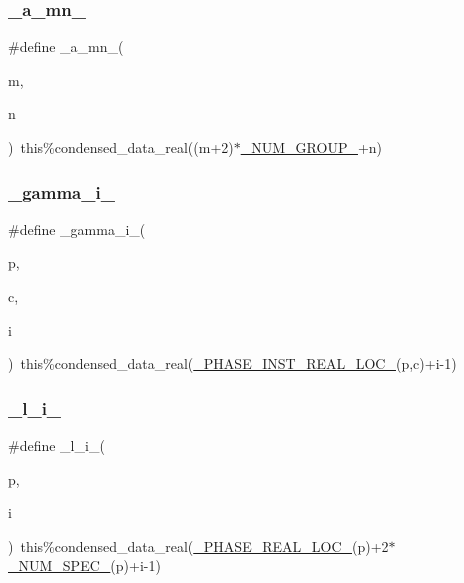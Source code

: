 \subsubsection{\texorpdfstring{\+\_\+a\+\_\+mn\+\_\+}{\_a\_mn\_}}
{\footnotesize\ttfamily \#define \+\_\+a\+\_\+mn\+\_\+(\begin{DoxyParamCaption}\item[{}]{m,  }\item[{}]{n }\end{DoxyParamCaption})~this\%condensed\+\_\+data\+\_\+real((m+2)$\ast$\mbox{\hyperlink{sub__model___u_n_i_f_a_c_8_f90_aaf6ff3fa100a1fa0baec9dba65df6891}{\+\_\+\+N\+U\+M\+\_\+\+G\+R\+O\+U\+P\+\_\+}}+n)}

\mbox{\label{sub__model___u_n_i_f_a_c_8_f90_a24dd72b4548c6a0a1cd1756ad308b128}} 
\subsubsection{\texorpdfstring{\+\_\+gamma\+\_\+i\+\_\+}{\_gamma\_i\_}}
{\footnotesize\ttfamily \#define \+\_\+gamma\+\_\+i\+\_\+(\begin{DoxyParamCaption}\item[{}]{p,  }\item[{}]{c,  }\item[{}]{i }\end{DoxyParamCaption})~this\%condensed\+\_\+data\+\_\+real(\mbox{\hyperlink{sub__model___u_n_i_f_a_c_8_f90_ae36fd1141e660c79dd12eac64d119f66}{\+\_\+\+P\+H\+A\+S\+E\+\_\+\+I\+N\+S\+T\+\_\+\+R\+E\+A\+L\+\_\+\+L\+O\+C\+\_\+}}(p,c)+i-\/1)}

\mbox{\label{sub__model___u_n_i_f_a_c_8_f90_af1c31ccacab06f0ad67cb12af666dfd3}} 
\subsubsection{\texorpdfstring{\+\_\+l\+\_\+i\+\_\+}{\_l\_i\_}}
{\footnotesize\ttfamily \#define \+\_\+l\+\_\+i\+\_\+(\begin{DoxyParamCaption}\item[{}]{p,  }\item[{}]{i }\end{DoxyParamCaption})~this\%condensed\+\_\+data\+\_\+real(\mbox{\hyperlink{sub__model___u_n_i_f_a_c_8_f90_a82db0e0fff4e8ab602fb50bebe0b7c38}{\+\_\+\+P\+H\+A\+S\+E\+\_\+\+R\+E\+A\+L\+\_\+\+L\+O\+C\+\_\+}}(p)+2$\ast$\mbox{\hyperlink{sub__model___u_n_i_f_a_c_8_f90_a6a6c2afb1b313ca5d982039833f5da8a}{\+\_\+\+N\+U\+M\+\_\+\+S\+P\+E\+C\+\_\+}}(p)+i-\/1)}

